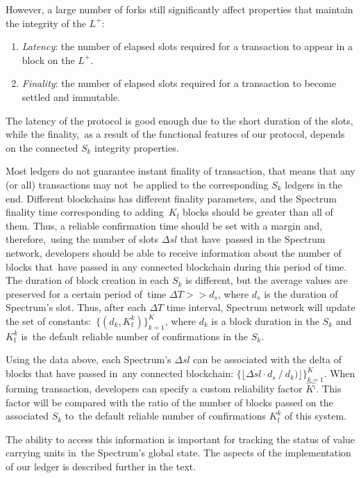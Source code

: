 However, a large number of forks still significantly affect properties that maintain the integrity of the $L^+$:
\begin{enumerate}
    \item \textit{Latency}: the number of elapsed slots required for a transaction to appear in a block on the $L^+$.
    \item \textit{Finality}: the number of elapsed slots required for a transaction to become settled and immutable.
\end{enumerate}
The latency of the protocol is good enough due to the short duration of the slots, while the finality,\
as a result of the functional features of our protocol, depends on the connected $S_k$ integrity properties.

Most ledgers do not guarantee instant finality of transaction, that means that any (or all) transactions may not\
be applied to the corresponding $S_k$ ledgers in the end.
Different blockchains has different finality parameters, and the Spectrum finality time corresponding to adding\
$K_{\text{f}}$ blocks should be greater than all of them.
Thus, a reliable confirmation time should be set with a margin and, therefore,\
using the number of slots $\Delta sl$ that have\
passed in the Spectrum network, developers should be able to receive information about the number of blocks that\
have passed in any connected blockchain during this period of time.
The duration of block creation in each $S_k$ is different, but the average values are preserved for a certain period of\
time ${\Delta T >> d_s}$, where $d_s$ is the duration of Spectrum's slot.
Thus, after each $\Delta T$ time interval, Spectrum network will update the set of constants:\
${\{(d_k, K^k_{\text{f}})\}_{k=1}^{K}}$, where $d_k$ is a block duration in the $S_k$ and $K^k_{\text{f}}$ is\
the default reliable number of confirmations in the $S_k$.

Using the data above, each Spectrum's $\Delta sl$ can be associated with the delta of blocks that have passed in\
any connected blockchain: ${\{\lfloor \Delta sl \cdot d_s \mathbin{/} d_k)\rfloor\}_{k=1}^{K}}$.
When forming transaction, developers can specify a custom reliability factor $\hat{K^_{\text{f}}}$.
This factor will be compared with the ratio of the number of blocks passed on the associated $S_k$ to\
the default reliable number of confirmations $K^k_{\text{f}}$ of this system.

The ability to access this information is important for tracking the status of value carrying units in\
the Spectrum's global state.
The aspects of the implementation of our ledger is described further in the text.



